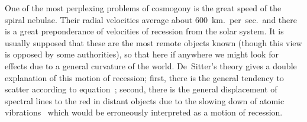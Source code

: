 \documentclass[12pt]{book}
\begin{document}
One of the most perplexing problems of cosmogony is the great speed of
the spiral nebulae. Their radial velocities average about $600$~km.\ per~sec.\ and
there is a great preponderance of velocities of recession from the solar system.
It is usually supposed that these are the most remote objects known (though
this view is opposed by some authorities), so that here if anywhere we might
look for effects due to a general curvature of the world. De~Sitter's theory
gives a double explanation of this motion of recession; first, there is the
general tendency to scatter according to equation~; second, there is
the general displacement of spectral lines to the red in distant objects due to
%
the slowing down of atomic vibrations~ which would be erroneously interpreted
as a motion of recession.
\end{document}
